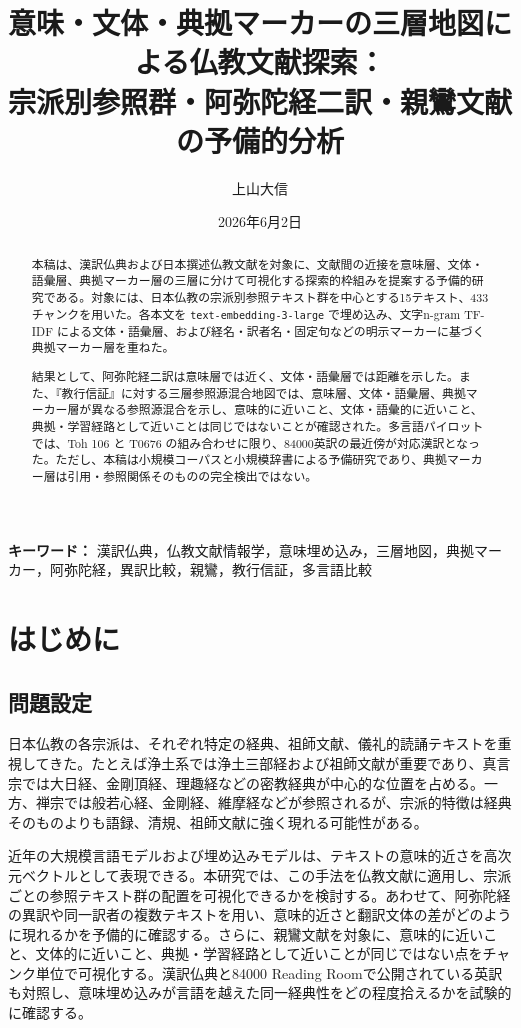 \documentclass[uplatex,dvipdfmx,11pt,a4paper]{jsarticle}
\title{意味・文体・典拠マーカーの三層地図による仏教文献探索：\\[0.35em]宗派別参照群・阿弥陀経二訳・親鸞文献の予備的分析}
\author{上山大信}
\date{2026年6月2日}
\begin{document}
\maketitle

\begin{abstract}
本稿は、漢訳仏典および日本撰述仏教文献を対象に、文献間の近接を意味層、文体・語彙層、典拠マーカー層の三層に分けて可視化する探索的枠組みを提案する予備的研究である。対象には、日本仏教の宗派別参照テキスト群を中心とする15テキスト、433チャンクを用いた。各本文を \texttt{text-embedding-3-large} で埋め込み、文字n-gram TF-IDF による文体・語彙層、および経名・訳者名・固定句などの明示マーカーに基づく典拠マーカー層を重ねた。

結果として、阿弥陀経二訳は意味層では近く、文体・語彙層では距離を示した。また、『教行信証』に対する三層参照源混合地図では、意味層、文体・語彙層、典拠マーカー層が異なる参照源混合を示し、意味的に近いこと、文体・語彙的に近いこと、典拠・学習経路として近いことは同じではないことが確認された。多言語パイロットでは、Toh 106 と T0676 の組み合わせに限り、84000英訳の最近傍が対応漢訳となった。ただし、本稿は小規模コーパスと小規模辞書による予備研究であり、典拠マーカー層は引用・参照関係そのものの完全検出ではない。
\end{abstract}

\noindent\textbf{キーワード：} 漢訳仏典，仏教文献情報学，意味埋め込み，三層地図，典拠マーカー，阿弥陀経，異訳比較，親鸞，教行信証，多言語比較

\section{はじめに}

\subsection{問題設定}

日本仏教の各宗派は、それぞれ特定の経典、祖師文献、儀礼的読誦テキストを重視してきた。たとえば浄土系では浄土三部経および祖師文献が重要であり、真言宗では大日経、金剛頂経、理趣経などの密教経典が中心的な位置を占める。一方、禅宗では般若心経、金剛経、維摩経などが参照されるが、宗派的特徴は経典そのものよりも語録、清規、祖師文献に強く現れる可能性がある。

近年の大規模言語モデルおよび埋め込みモデルは、テキストの意味的近さを高次元ベクトルとして表現できる。本研究では、この手法を仏教文献に適用し、宗派ごとの参照テキスト群の配置を可視化できるかを検討する。あわせて、阿弥陀経の異訳や同一訳者の複数テキストを用い、意味的近さと翻訳文体の差がどのように現れるかを予備的に確認する。さらに、親鸞文献を対象に、意味的に近いこと、文体的に近いこと、典拠・学習経路として近いことが同じではない点をチャンク単位で可視化する。漢訳仏典と84000 Reading Roomで公開されている英訳も対照し、意味埋め込みが言語を越えた同一経典性をどの程度拾えるかを試験的に確認する。
\end{document}
